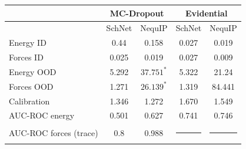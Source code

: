 \begin{tabular}{lcccc}
\toprule
 & \multicolumn{2}{c}{MC-Dropout} & \multicolumn{2}{c}{Evidential}  \\
\midrule
             & SchNet & NequIP  & SchNet & NequIP \\
 \midrule
Energy ID    & 0.44 & 0.158  & 0.027 & 0.019 \\
Forces ID    & 0.025 & 0.019  & 0.027 & 0.009 \\
Energy OOD   & 5.292 & $37.751^{*}$  & 5.322 & 21.24 \\
Forces OOD   & 1.271 & $26.139^{*}$  & 1.319 & 84.441 \\
\midrule
Calibration  & 1.346 & 1.272  & 1.670 & 1.549 \\
 \midrule
AUC-ROC energy    & 0.501 & 0.627  & 0.741 & 0.746\\
AUC-ROC forces (trace)    & 0.8 & 0.988  & \noindent\rule{0.8cm}{0.6pt} & \noindent\rule{0.8cm}{0.6pt}\\
\bottomrule
\end{tabular}